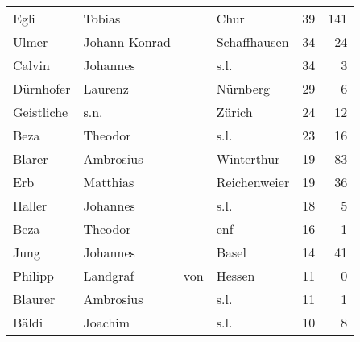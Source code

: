 \begin{center}
\begin{tiny}
\begin{longtabu}{llllrr}
                     Egli &                             Tobias &             &                                        Chur &         39 &       141 \\
                    Ulmer &                      Johann Konrad &             &                                Schaffhausen &         34 &        24 \\
                   Calvin &                           Johannes &             &                                        s.l. &         34 &         3 \\
                Dürnhofer &                            Laurenz &             &                                    Nürnberg &         29 &         6 \\
               Geistliche &                               s.n. &             &                                      Zürich &         24 &        12 \\
                     Beza &                            Theodor &             &                                        s.l. &         23 &        16 \\
                   Blarer &                          Ambrosius &             &                                  Winterthur &         19 &        83 \\
                      Erb &                           Matthias &             &                                Reichenweier &         19 &        36 \\
                   Haller &                           Johannes &             &                                        s.l. &         18 &         5 \\
                     Beza &                            Theodor &             &                                         enf &         16 &         1 \\
                     Jung &                           Johannes &             &                                       Basel &         14 &        41 \\
                  Philipp &                           Landgraf &         von &                                      Hessen &         11 &         0 \\
                  Blaurer &                          Ambrosius &             &                                        s.l. &         11 &         1 \\
                    Bäldi &                            Joachim &             &                                        s.l. &         10 &         8 \\

\end{longtabu}
\end{tiny}
\end{center}
